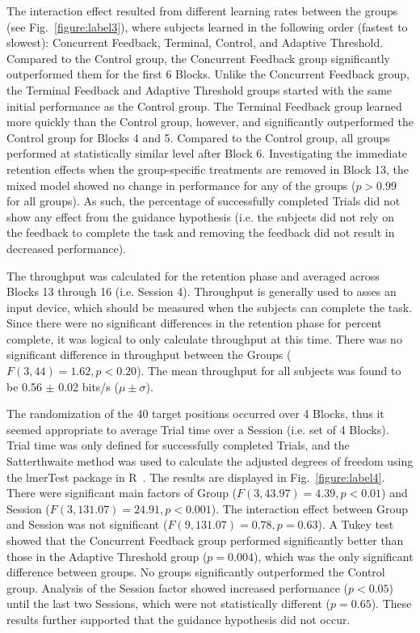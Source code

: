The interaction effect resulted from different learning rates between the groups (see Fig.~\ref{figure:label3}), where subjects learned in the following order (fastest to slowest): Concurrent Feedback, Terminal, Control, and Adaptive Threshold.
Compared to the Control group, the Concurrent Feedback group significantly outperformed them for the first 6 Blocks.
Unlike the Concurrent Feedback group, the Terminal Feedback and Adaptive Threshold groups started with the same initial performance as the Control group.
The Terminal Feedback group learned more quickly than the Control group, however, and significantly outperformed the Control group for Blocks 4 and 5.
Compared to the Control group, all groups performed at statistically similar level after Block 6.
Investigating the immediate retention effects when the group-specific treatments are removed in Block 13, the mixed model showed no change in performance for any of the groups ($p > 0.99$ for all groups).
As such, the percentage of successfully completed Trials did not show any effect from the guidance hypothesis (i.e. the subjects did not rely on the feedback to complete the task and removing the feedback did not result in decreased performance).

The throughput was calculated for the retention phase and averaged across Blocks 13 through 16 (i.e. Session 4).
Throughput is generally used to asses an input device, which should be measured when the subjects can complete the task.
Since there were no significant differences in the retention phase for percent complete, it was logical to only calculate throughput at this time.
There was no significant difference in throughput between the Groups ($F(3, 44) = 1.62, p < 0.20$).
The mean throughput for all subjects was found to be 0.56 $\pm$ 0.02 bits/s ($\mu\pm\sigma$).

The randomization of the 40 target positions occurred over 4 Blocks, thus it seemed appropriate to average Trial time over a Session (i.e. set of 4 Blocks).
Trial time was only defined for successfully completed Trials, and the Satterthwaite method was used to calculate the adjusted degrees of freedom using the lmerTest package in R~\cite{RN53}.
The results are displayed in Fig.~\ref{figure:label4}.
There were significant main factors of Group ($F(3, 43.97) = 4.39, p < 0.01$) and Session ($F(3, 131.07) = 24.91, p < 0.001$).
The interaction effect between Group and Session was not significant ($F(9, 131.07) = 0.78, p = 0.63$).
A Tukey test showed that the Concurrent Feedback group performed significantly better than those in the Adaptive Threshold group ($p = 0.004$), which was the only significant difference between groups.
No groups significantly outperformed the Control group.
Analysis of the Session factor showed increased performance ($p < 0.05$) until the last two Sessions, which were not statistically different ($p = 0.65$).
These results further supported that the guidance hypothesis did not occur.

